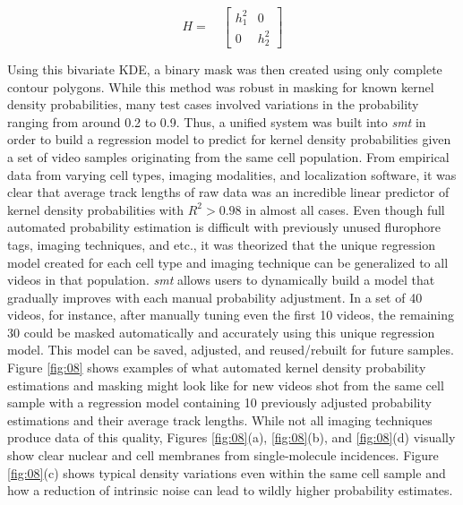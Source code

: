 \documentclass{bioinfo}
\begin{document}
\begin{equation}
H =
\quad
\begin{bmatrix} 
h_1^2 & 0 \\
0 & h_2^2 
\end{bmatrix}
\end{equation}

Using this bivariate KDE, a binary mask was then created using only complete contour polygons. While this method was robust in masking for known kernel density probabilities, many test cases involved variations in the probability ranging from around 0.2 to 0.9. Thus, a unified system was built into \textit{smt} in order to build a regression model to predict for kernel density probabilities given a set of video samples originating from the same cell population. From empirical data from varying cell types, imaging modalities, and localization software, it was clear that average track lengths of raw data was an incredible linear predictor of kernel density probabilities with $R^2 > 0.98$ in almost all cases. Even though full automated probability estimation is difficult with previously unused flurophore tags, imaging techniques, and etc., it was theorized that the unique regression model created for each cell type and imaging technique can be generalized to all videos in that population. \textit{smt} allows users to dynamically build a model that gradually improves with each manual probability adjustment. In a set of 40 videos, for instance, after manually tuning even the first 10 videos, the remaining 30 could be masked automatically and accurately using this unique regression model. This model can be saved, adjusted, and reused/rebuilt for future samples. Figure \ref{fig:08} shows examples of what automated kernel density probability estimations and masking might look like for new videos shot from the same cell sample with a regression model containing 10 previously adjusted probability estimations and their average track lengths. While not all imaging techniques produce data of this quality, Figures \ref{fig:08}(a), \ref{fig:08}(b), and \ref{fig:08}(d) visually show clear nuclear and cell membranes from single-molecule incidences. Figure \ref{fig:08}(c) shows typical density variations even within the same cell sample and how a reduction of intrinsic noise can lead to wildly higher probability estimates.
\end{document}
